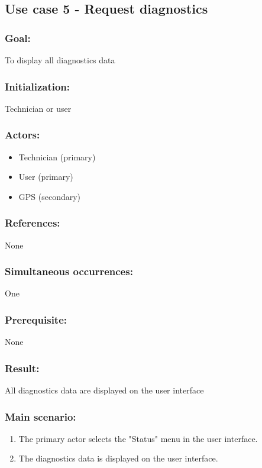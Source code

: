 \begin{framed}
	\subsection{Use case 5 - Request diagnostics}
	\subsubsection*{Goal:}
	To display all diagnostics data
	
	\subsubsection*{Initialization:}
	Technician or user
	
	\subsubsection*{Actors:}
	\begin{itemize}
		\item Technician (primary)
		\item User (primary)
		\item GPS (secondary)
	\end{itemize}
	
	\subsubsection*{References:}
	None
	
	\subsubsection*{Simultaneous occurrences:}
	One
	
	\subsubsection*{Prerequisite:}
	None
	
	\subsubsection*{Result:}
	All diagnostics data are displayed on the user interface
	
	\subsubsection*{Main scenario:}
	\begin{enumerate}
		\item The primary actor selects the "Status" menu in the user interface.
		\item The diagnostics data is displayed on the user interface. 
	\end{enumerate}
\end{framed}



